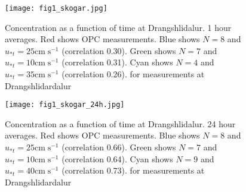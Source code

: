 \begin{figure}[t]
\texttt{[image: fig1\_skogar.jpg]}
\caption{Concentration as a function of time at Drangshlidalur. 1 hour averages.
Red shows OPC measurements. Blue shows $N=8$ and $u_{*t}=25\mathrm{cm}\;\mathrm{s}^{-1}$ (correlation 0.30).
Green shows $N=7$ and $u_{*t}=10\mathrm{cm}\;\mathrm{s}^{-1}$ (correlation 0.31).
Cyan shows $N=4$ and $u_{*t}=35\mathrm{cm}\;\mathrm{s}^{-1}$ (correlation 0.26).
for measurements at  Drangshlidardalur}
\label{fig:concplotskogar}
\end{figure}

\begin{figure}[t]
\texttt{[image: fig1\_skogar\_24h.jpg]}
\caption{Concentration as a function of time at Drangshlidalur. 24 hour averages.
Red shows OPC measurements. Blue shows $N=8$ and $u_{*t}=25\mathrm{cm}\;\mathrm{s}^{-1}$ (correlation 0.66).
Green shows $N=7$ and $u_{*t}=10\mathrm{cm}\;\mathrm{s}^{-1}$ (correlation 0.64).
Cyan shows $N=9$ and $u_{*t}=40\mathrm{cm}\;\mathrm{s}^{-1}$ (correlation 0.73).
for measurements at  Drangshlidardalur}
\label{fig:concplotskogar24}
\end{figure}



